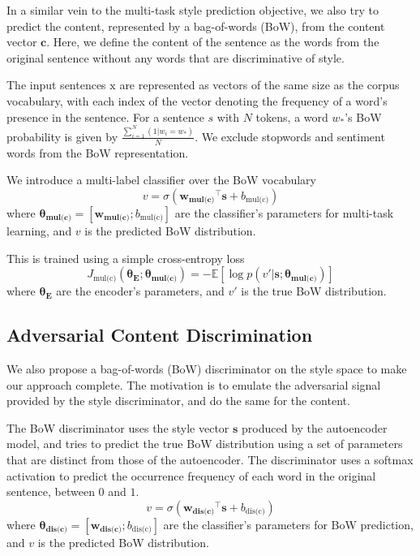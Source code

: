 \documentclass[letterpaper]{article} %
\newcommand{\rmx}{\mathrm x}
\newcommand{\loss}[1]{J_{\text{#1}}}
\newcommand{\nnweight}[1]{\bm{\theta_{\text{#1}}}}
\newcommand{\weight}[1]{\bm{w_{\text{#1}}}}
\newcommand{\bias}[1]{b_{\text{#1}}}
\begin{document}
In a similar vein to the multi-task style prediction objective, we also try to predict the content, represented by a bag-of-words (BoW), from the content vector $\bm c$.
Here, we define the content of the sentence as the words from the original sentence without any words that are discriminative of style.

The input sentences $\rmx$ are represented as vectors of the same size as the corpus vocabulary, with each index of the vector denoting the frequency of a word's presence in the sentence.
For a sentence $s$ with $N$ tokens, a word $w_*$'s BoW probability is given by $\frac{\sum_{i=1}^{N}{(1 | w_i = w_*)}}{N}$.
We exclude stopwords and sentiment words \cite{hu2004mining} from the BoW representation.

We introduce a multi-label classifier over the BoW vocabulary
\begin{equation} \label{eqn:bow-pred}
	v = \sigma({\weight{mul(c)}}^\top \bm s + \bias{mul(c)})
\end{equation}
where $\nnweight{mul(c)}=[\weight{mul(c)}; \bias{mul(c)}]$ are the classifier's parameters for multi-task learning, and $v$ is the predicted BoW distribution.

This is trained using a simple cross-entropy loss
\begin{equation} \label{eqn:content-multi-task-loss}
	\loss{mul(c)}(\nnweight{E};\nnweight{mul(c)}) =
	- \mathbb{E} [\log p(v' | \bm s; \nnweight{mul(c)})]
\end{equation}
where $\nnweight{E}$ are the encoder's parameters, and $v'$ is the true BoW distribution.


\subsection{Adversarial Content Discrimination} \label{ssec:adversarial-content-objective}

We also propose a bag-of-words (BoW) discriminator on the style space to make our approach complete.
The motivation is to emulate the adversarial signal provided by the style discriminator, and do the same for the content.

The BoW discriminator uses the style vector $\bm s$ produced by the autoencoder model, and tries to predict the true BoW distribution using a set of parameters that are distinct from those of the autoencoder.
The discriminator uses a softmax activation to predict the occurrence frequency of each word in the original sentence, between $0$ and $1$.
\begin{equation}
	v = \sigma({\weight{dis(c)}}^\top \bm s + \bias{dis(c)})
\end{equation}
where $\nnweight{dis(c)}=[\weight{dis(c)}; \bias{dis(c)}]$ are the classifier's parameters for BoW prediction, and $v$ is the predicted BoW distribution.
\end{document}
